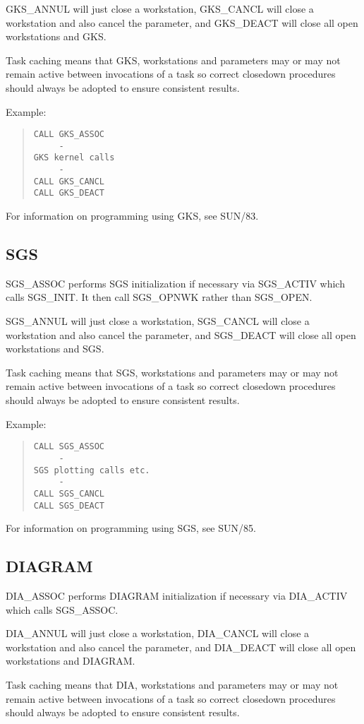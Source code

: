GKS\_ANNUL will just close a workstation,
GKS\_CANCL will close a workstation and also cancel the parameter,
and GKS\_DEACT will close all open workstations and GKS.

Task caching means that GKS, workstations and parameters
may or may not remain active between invocations of a task so correct
closedown procedures should always be adopted to ensure consistent results.

Example:
\begin{quote} \begin{verbatim}
CALL GKS_ASSOC
     -
GKS kernel calls
     -
CALL GKS_CANCL
CALL GKS_DEACT
\end{verbatim} \end{quote}
For information on programming using GKS, see SUN/83.

\subsection{SGS}
SGS\_ASSOC performs SGS initialization if necessary via SGS\_ACTIV which calls
SGS\_INIT. It then call SGS\_OPNWK rather than SGS\_OPEN.

SGS\_ANNUL will just close a workstation,
SGS\_CANCL will close a workstation and also cancel the parameter,
and SGS\_DEACT will close all open workstations and SGS.

Task caching means that SGS, workstations and parameters
may or may not remain active between invocations of a task so correct
closedown procedures should always be adopted to ensure consistent results.

Example:
\begin{quote} \begin{verbatim}
CALL SGS_ASSOC
     -
SGS plotting calls etc.
     -
CALL SGS_CANCL
CALL SGS_DEACT
\end{verbatim} \end{quote}
For information on programming using SGS, see SUN/85.

\subsection{DIAGRAM}
DIA\_ASSOC performs DIAGRAM initialization if necessary via DIA\_ACTIV which
calls SGS\_ASSOC.

DIA\_ANNUL will just close a workstation,
DIA\_CANCL will close a workstation and also cancel the parameter,
and DIA\_DEACT will close all open workstations and DIAGRAM.

Task caching means that DIA, workstations and parameters
may or may not remain active between invocations of a task so correct
closedown procedures should always be adopted to ensure consistent results.

